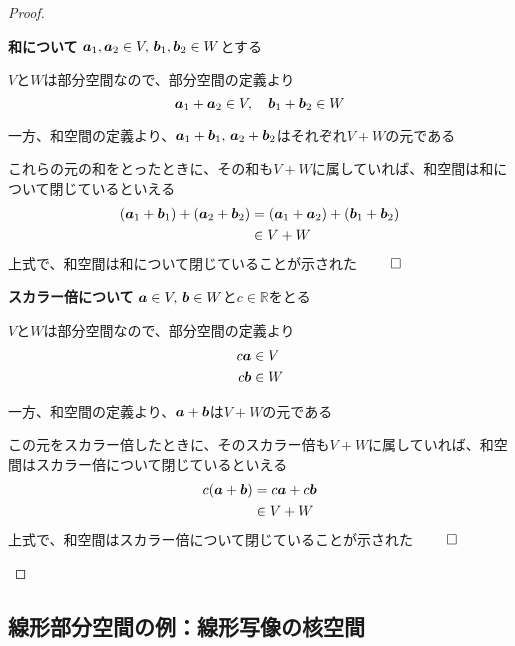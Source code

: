 \documentclass[../../../topic_linear-algebra]{subfiles}
\begin{document}
\begin{proof}
  \begin{subpattern}{\bfseries 和について}
    $\vb*{a}_1, \vb*{a}_2 \in V, \, \vb*{b}_1, \vb*{b}_2 \in W$とする

    $V$と$W$は部分空間なので、部分空間の定義より
    \begin{equation*}
      \vb*{a}_1 + \vb*{a}_2 \in V, \quad \vb*{b}_1 + \vb*{b}_2 \in W
    \end{equation*}

    一方、和空間の定義より、$\vb*{a}_1 + \vb*{b}_1,\, \vb*{a}_2 + \vb*{b}_2$はそれぞれ$V+W$の元である

    これらの元の和をとったときに、その和も$V + W$に属していれば、和空間は和について閉じているといえる
    \begin{align*}
      (\vb*{a}_1 + \vb*{b}_1) + (\vb*{a}_2 + \vb*{b}_2) & = (\vb*{a}_1 + \vb*{a}_2) + (\vb*{b}_1 + \vb*{b}_2) \\
                                                        & \in V + W
    \end{align*}
    上式で、和空間は和について閉じていることが示された $\qed$
  \end{subpattern}

  \begin{subpattern}{\bfseries スカラー倍について}
    $\vb*{a} \in V, \, \vb*{b} \in W$と$c \in \mathbb{R}$をとる

    $V$と$W$は部分空間なので、部分空間の定義より
    \begin{align*}
      c \vb*{a} & \in V \\
      c \vb*{b} & \in W
    \end{align*}

    一方、和空間の定義より、$\vb*{a} + \vb*{b}$は$V + W$の元である

    この元をスカラー倍したときに、そのスカラー倍も$V + W$に属していれば、和空間はスカラー倍について閉じているといえる
    \begin{align*}
      c(\vb*{a} + \vb*{b}) & = c \vb*{a} + c \vb*{b} \\
                           & \in V + W
    \end{align*}
    上式で、和空間はスカラー倍について閉じていることが示された $\qed$
  \end{subpattern}
\end{proof}

\subsection{線形部分空間の例：線形写像の核空間}
\end{document}
